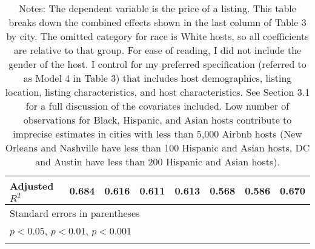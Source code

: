 {\begin{longtable}{l*{7}{c}}
Adjusted \(R^{2}\)  &       0.684         &       0.616         &       0.611         &       0.613         &       0.568         &       0.586         &       0.670         \\
\hline\hline
\multicolumn{8}{l}{\footnotesize Standard errors in parentheses}\\
\multicolumn{8}{l}{\footnotesize \sym{*} \(p<0.05\), \sym{**} \(p<0.01\), \sym{***} \(p<0.001\)}\\
\caption*{Notes: The dependent variable is the price of a listing. This table breaks down the combined effects shown in the last column of Table 3 by city. The omitted category for race is White hosts, so all coefficients are relative to that group. For ease of reading, I did not include the gender of the host. I control for my preferred specification (referred to as Model 4 in Table 3) that includes host demographics, listing location, listing characteristics, and host characteristics. See Section 3.1 for a full discussion of the covariates included. Low number of observations for Black, Hispanic, and Asian hosts contribute to imprecise estimates in cities with less than 5,000 Airbnb hosts (New Orleans and Nashville have less than 100 Hispanic and Asian hosts, DC and Austin have less than 200 Hispanic and Asian hosts).}
\end{longtable}
}



